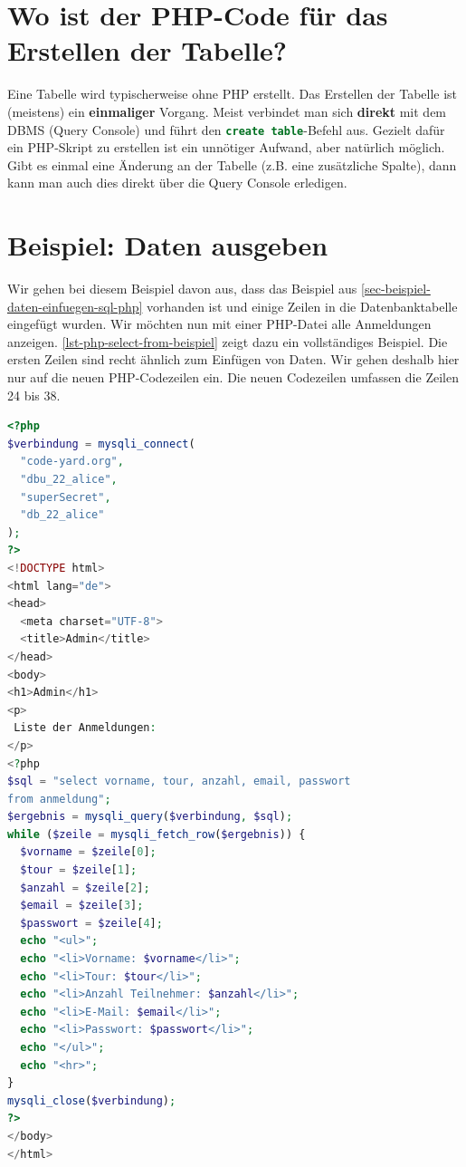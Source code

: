\section{Wo ist der \acs{PHP}-Code für das Erstellen der Tabelle?}

Eine Tabelle wird typischerweise ohne \ac{PHP} erstellt. Das Erstellen der Tabelle ist (meistens) ein \textbf{einmaliger} Vorgang. Meist verbindet man sich \textbf{direkt} mit dem \ac{DBMS} (Query Console) und führt den \lstinline[language=SQL]{create table}-Befehl aus. Gezielt dafür ein \ac{PHP}-Skript zu erstellen ist ein unnötiger Aufwand, aber natürlich möglich. Gibt es einmal eine Änderung an der Tabelle (z.B. eine zusätzliche Spalte), dann kann man auch dies direkt über die Query Console erledigen.

\newpage

\section{Beispiel: Daten ausgeben}

Wir gehen bei diesem Beispiel davon aus, dass das Beispiel aus \autoref{sec-beispiel-daten-einfuegen-sql-php} vorhanden ist und einige Zeilen in die Datenbanktabelle eingefügt wurden. Wir möchten nun mit einer \ac{PHP}-Datei alle Anmeldungen anzeigen. \autoref{lst-php-select-from-beispiel} zeigt dazu ein vollständiges Beispiel. Die ersten Zeilen sind recht ähnlich zum Einfügen von Daten. Wir gehen deshalb hier nur auf die neuen \ac{PHP}-Codezeilen ein. Die neuen Codezeilen umfassen die Zeilen \num{24} bis \num{38}.

\begin{lstlisting}[language=PHP, alsolanguage=HTML, upquote=true, caption={Alle Anmeldedaten aus der Tabelle \texttt{anmeldung} werden auf der Webseite angezeigt.}, label={lst-php-select-from-beispiel}]
<?php
$verbindung = mysqli_connect(
  "code-yard.org",
  "dbu_22_alice",
  "superSecret",
  "db_22_alice"
);
?>
<!DOCTYPE html>
<html lang="de">
<head>
  <meta charset="UTF-8">
  <title>Admin</title>
</head>
<body>
<h1>Admin</h1>
<p>
 Liste der Anmeldungen:
</p>
<?php
$sql = "select vorname, tour, anzahl, email, passwort 
from anmeldung";
$ergebnis = mysqli_query($verbindung, $sql);
while ($zeile = mysqli_fetch_row($ergebnis)) {
  $vorname = $zeile[0];
  $tour = $zeile[1];
  $anzahl = $zeile[2];
  $email = $zeile[3];
  $passwort = $zeile[4];
  echo "<ul>";
  echo "<li>Vorname: $vorname</li>";
  echo "<li>Tour: $tour</li>";
  echo "<li>Anzahl Teilnehmer: $anzahl</li>";
  echo "<li>E-Mail: $email</li>";
  echo "<li>Passwort: $passwort</li>";
  echo "</ul>";
  echo "<hr>";
}
mysqli_close($verbindung);
?>
</body>
</html>
\end{lstlisting}

